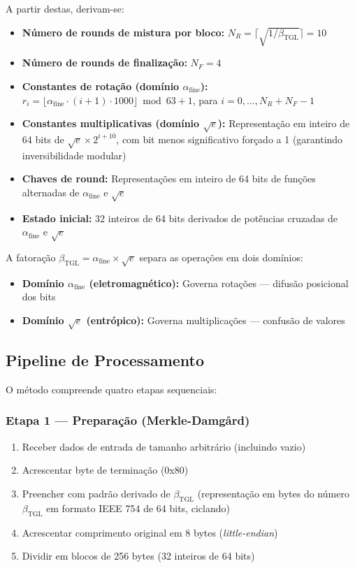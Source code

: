 \documentclass[12pt,a4paper]{article}
\newcommand{\betatgl}{\beta_{\!\scriptscriptstyle\mathrm{TGL}}}
\newcommand{\afine}{\alpha_{\mathrm{fine}}}
\begin{document}
A partir destas, derivam-se:

\begin{itemize}[nosep]
\item \textbf{Número de rounds de mistura por bloco:} $N_R = \lceil\sqrt{1/\betatgl}\rceil = 10$
\item \textbf{Número de rounds de finalização:} $N_F = 4$
\item \textbf{Constantes de rotação (domínio $\afine$):} $r_i = \lfloor \afine \cdot (i+1) \cdot 1000 \rfloor \bmod 63 + 1$, para $i = 0, \ldots, N_R + N_F - 1$
\item \textbf{Constantes multiplicativas (domínio $\sqrt{e}$):} Representação em inteiro de 64 bits de $\sqrt{e} \times 2^{i+10}$, com bit menos significativo forçado a 1 (garantindo inversibilidade modular)
\item \textbf{Chaves de round:} Representações em inteiro de 64 bits de funções alternadas de $\afine$ e $\sqrt{e}$
\item \textbf{Estado inicial:} 32 inteiros de 64 bits derivados de potências cruzadas de $\afine$ e $\sqrt{e}$
\end{itemize}

A fatoração $\betatgl = \afine \times \sqrt{e}$ separa as operações em dois domínios:
\begin{itemize}[nosep]
\item \textbf{Domínio $\afine$ (eletromagnético):} Governa rotações --- difusão posicional dos bits
\item \textbf{Domínio $\sqrt{e}$ (entrópico):} Governa multiplicações --- confusão de valores
\end{itemize}

\subsection{Pipeline de Processamento}

O método compreende quatro etapas sequenciais:

\subsubsection{Etapa 1 --- Preparação (Merkle-Damgård)}

\begin{enumerate}[nosep]
\item Receber dados de entrada de tamanho arbitrário (incluindo vazio)
\item Acrescentar byte de terminação (0x80)
\item Preencher com padrão derivado de $\betatgl$ (representação em bytes do número $\betatgl$ em formato IEEE 754 de 64 bits, ciclando)
\item Acrescentar comprimento original em 8 bytes (\textit{little-endian})
\item Dividir em blocos de 256 bytes (32 inteiros de 64 bits)
\end{enumerate}
\end{document}
